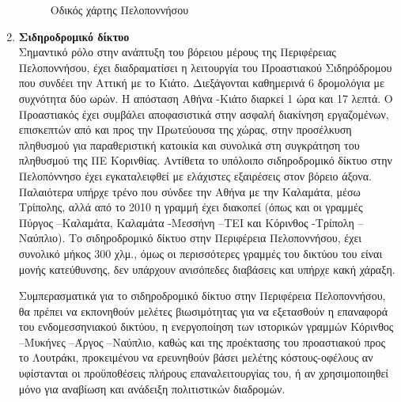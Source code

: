 \documentclass[12pt]{article}
\begin{document}
\begin{enumerate}
\begin{figure} [H]
\begin{center}
				\caption{Οδικός χάρτης Πελοποννήσου}
			\end{center}
		\end{figure}
		\item \textbf{Σιδηροδρομικό δίκτυο} \\
		Σημαντικό ρόλο στην ανάπτυξη του βόρειου μέρους της Περιφέρειας Πελοποννήσου, έχει διαδραματίσει η λειτουργία του Προαστιακού Σιδηρόδρομου που συνδέει την Αττική με το Κιάτο. Διεξάγονται καθημερινά 6 δρομολόγια με συχνότητα δύο ωρών. Η απόσταση Αθήνα -Κιάτο διαρκεί 1 ώρα και 17 λεπτά. Ο Προαστιακός έχει συμβάλει αποφασιστικά στην ασφαλή διακίνηση εργαζομένων, επισκεπτών από και προς την Πρωτεύουσα της χώρας, στην προσέλκυση πληθυσμού για παραθεριστική κατοικία και συνολικά στη συγκράτηση του πληθυσμού της ΠΕ Κορινθίας. Αντίθετα το υπόλοιπο σιδηροδρομικό δίκτυο στην Πελοπόννησο έχει εγκαταλειφθεί με ελάχιστες εξαιρέσεις στον βόρειο άξονα. Παλαιότερα υπήρχε τρένο που σύνδεε την Αθήνα με την Καλαμάτα, μέσω Τρίπολης, αλλά από το 2010 η γραμμή έχει διακοπεί (όπως και οι γραμμές Πύργος –Καλαμάτα, Καλαμάτα -Μεσσήνη –ΤΕΙ και Κόρινθος -Τρίπολη –Ναύπλιο). Το σιδηροδρομικό δίκτυο στην Περιφέρεια Πελοποννήσου, έχει συνολικό μήκος 300 χλμ., όμως οι περισσότερες  γραμμές του δικτύου του είναι μονής κατεύθυνσης, δεν υπάρχουν ανισόπεδες διαβάσεις και υπήρχε κακή χάραξη.
		
		Συμπερασματικά για το σιδηροδρομικό δίκτυο στην Περιφέρεια Πελοποννήσου, θα πρέπει να εκπονηθούν μελέτες βιωσιμότητας για να εξετασθούν η επαναφορά του ενδομεσσηνιακού δικτύου, η ενεργοποίηση των ιστορικών γραμμών Κόρινθος –Μυκήνες –Άργος –Ναύπλιο, καθώς και της προέκτασης του προαστιακού προς το Λουτράκι, προκειμένου να ερευνηθούν βάσει μελέτης κόστους-οφέλους αν υφίστανται οι προϋποθέσεις πλήρους επαναλειτουργίας του, ή αν χρησιμοποιηθεί μόνο για αναβίωση και ανάδειξη πολιτιστικών διαδρομών.
		

\end{enumerate}
\end{document}
